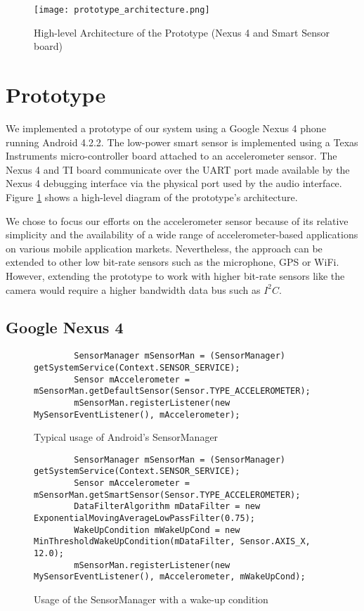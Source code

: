 
\begin{figure}[t]
	\texttt{[image: prototype\_architecture.png]}
	\caption{High-level Architecture of the Prototype (Nexus 4 and Smart Sensor board)}
    \label{fig:prototypeArchitecture}
\end{figure}

\section{Prototype}
\label{sec:prototype}

We implemented a prototype of our system using a Google Nexus 4 phone
running Android 4.2.2. The low-power smart sensor is implemented using
a Texas Instruments micro-controller board attached to an
accelerometer sensor. The Nexus 4 and TI board communicate over the
UART port made available by the Nexus 4 debugging interface via the
physical port used by the audio interface. Figure
\ref{fig:prototypeArchitecture} shows a high-level diagram of the
prototype's architecture.

We chose to focus our efforts on the accelerometer sensor because of
its relative simplicity and the availability of a wide range of
accelerometer-based applications on various mobile application
markets. Nevertheless, the approach can be extended to other low
bit-rate sensors such as the microphone, GPS or WiFi. However,
extending the prototype to work with higher bit-rate sensors like the
camera would require a higher bandwidth data bus such as $I^2C$.


\subsection{Google Nexus 4}
\label{subsec:nexus}

\begin{figure*}[t]
{\small
	\begin{verbatim}
		SensorManager mSensorMan = (SensorManager) getSystemService(Context.SENSOR_SERVICE);
		Sensor mAccelerometer = mSensorMan.getDefaultSensor(Sensor.TYPE_ACCELEROMETER);
		mSensorMan.registerListener(new MySensorEventListener(), mAccelerometer);
	\end{verbatim}
}
	\caption{Typical usage of Android's SensorManager}
    \label{fig:androidSensorCodeNormal}
\end{figure*}

\begin{figure*}[t]
{\small
	\begin{verbatim}
		SensorManager mSensorMan = (SensorManager) getSystemService(Context.SENSOR_SERVICE);
		Sensor mAccelerometer = mSensorMan.getSmartSensor(Sensor.TYPE_ACCELEROMETER);
		DataFilterAlgorithm mDataFilter = new ExponentialMovingAverageLowPassFilter(0.75);
		WakeUpCondition mWakeUpCond = new MinThresholdWakeUpCondition(mDataFilter, Sensor.AXIS_X, 12.0);
		mSensorMan.registerListener(new MySensorEventListener(), mAccelerometer, mWakeUpCond);
	\end{verbatim}
}
	\caption{Usage of the SensorManager with a wake-up condition}
    \label{fig:androidSensorCodeModified}
\end{figure*}

